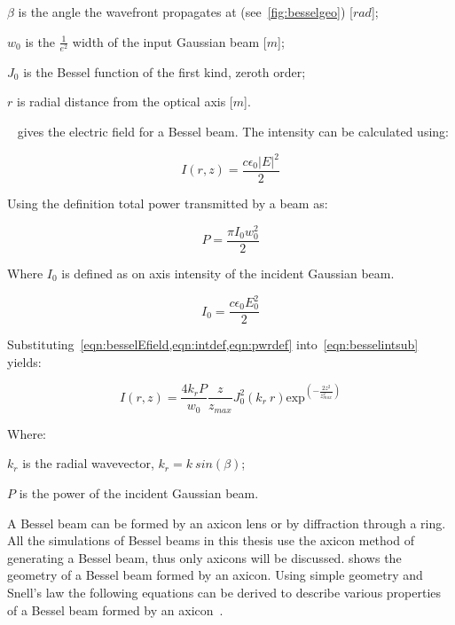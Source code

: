     \indent $\beta$ is the angle the wavefront propagates at (see~\cref{fig:besselgeo}) [$rad$]; 

    \indent $w_0$ is the $\tfrac{1}{e^2}$ width of the input Gaussian beam [$m$]; 

    \indent $J_0$ is the Bessel function of the first kind, zeroth order; 

    \indent $r$ is radial distance from the optical axis [$m$]. 

\medskip


~ gives the electric field for a Bessel beam. The intensity can be calculated using:

\begin{equation}
    I(r,z)=\frac{c\epsilon_0\left|E\right|^2}{2}
    \label{eqn:besselintsub}
\end{equation}

Using the definition total power transmitted by a beam as:

\begin{equation}
    P=\frac{\pi I_0w_0^2}{2}
    \label{eqn:pwrdef}
\end{equation}

Where $I_0$ is defined as on axis intensity of the incident Gaussian beam.

\begin{equation}
    I_0=\frac{c\epsilon_0E_0^2}{2}
    \label{eqn:intdef}
\end{equation}

Substituting~\cref{eqn:besselEfield,eqn:intdef,eqn:pwrdef} into~\cref{eqn:besselintsub} yields:

\begin{equation}
    I(r,z)=\frac{4k_rP}{w_0}\frac{z}{z_{max}}J_0^2\left(k_r\ r\right)\text{exp}^{\left(-\frac{2z^2}{z^2_{max}}\right)}
    \label{eqn:besselInt}
\end{equation}


\noindent Where:

    \indent $k_r$ is the radial wavevector, $k_r=k\ sin(\beta)$;

    \indent $P$ is the power of the incident Gaussian beam.

    \medskip

A Bessel beam can be formed by an axicon lens or by diffraction through a ring.
All the simulations of Bessel beams in this thesis use the axicon method of generating a Bessel beam, thus only axicons will be discussed.
 shows the geometry of a Bessel beam formed by an axicon.
Using simple geometry and Snell's law the following equations can be derived to describe various properties of a Bessel beam formed by an axicon~\cite{merola2012characterization}.

